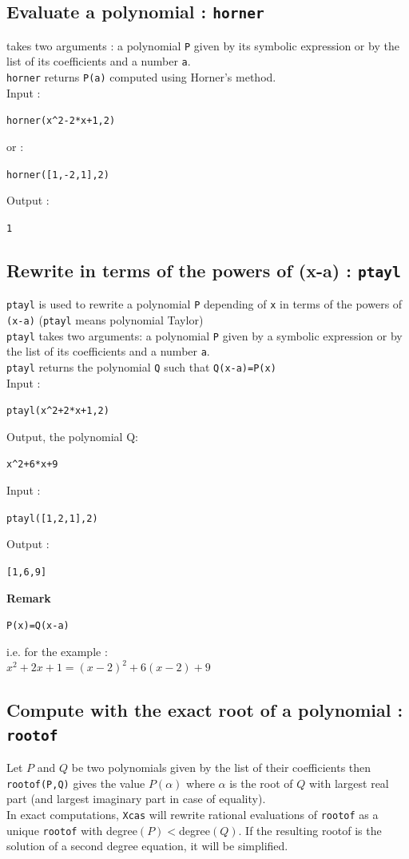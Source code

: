 \documentclass[a4paper,11pt]{book}
\begin{document}
\subsection{Evaluate a polynomial : {\tt horner}}
 takes two arguments : a polynomial {\tt P} given by its 
symbolic expression or by the list of its coefficients and a number {\tt a}.\\ 
{\tt  horner} returns {\tt P(a)} computed using Horner's method.\\
Input :
\begin{center}{\tt  horner(x\verb|^|2-2*x+1,2)}\end{center}
or  :
\begin{center}{\tt  horner([1,-2,1],2)}\end{center}
Output :
\begin{center}{\tt 1}\end{center}

\subsection{Rewrite in terms of the powers of (x-a) : {\tt ptayl}}
{\tt ptayl} is used to rewrite a polynomial {\tt P} depending of {\tt x}
in terms of the powers of {\tt (x-a)} 
({\tt ptayl} means polynomial Taylor)\\
{\tt ptayl} takes two arguments: a polynomial {\tt P} given by a
symbolic expression or by the list of its coefficients and 
a number {\tt a}.\\
{\tt ptayl} returns the polynomial {\tt Q} such that {\tt Q(x-a)=P(x)}\\
Input :
\begin{center}{\tt ptayl(x\verb|^|2+2*x+1,2)}\end{center}
Output, the  polynomial Q:
\begin{center}{\tt  x\verb|^|2+6*x+9}\end{center}
Input :
\begin{center}{\tt  ptayl([1,2,1],2)}\end{center}
Output :
\begin{center}{\tt [1,6,9]}\end{center}
{\bf Remark}
\begin{center}{\tt P(x)=Q(x-a)}\end{center}
i.e. for the example :\\
$x^2+2x+1=(x-2)^2+6(x-2)+9$

\subsection{Compute with the exact root  of a polynomial : {\tt rootof}}
Let $P$ and $Q$ be two polynomials given by the list of their coefficients
then {\tt rootof(P,Q)} gives the value $P(\alpha)$ where $\alpha$ is the 
root of $Q$ with largest real part (and largest imaginary part in
case of equality).\\
In exact computations, {\tt Xcas} will rewrite rational evaluations
of {\tt rootof} as a unique {\tt rootof} with degree$(P)<$degree$(Q)$.
If the resulting rootof is the solution of a second degree equation,
it will be simplified.
\end{document}
